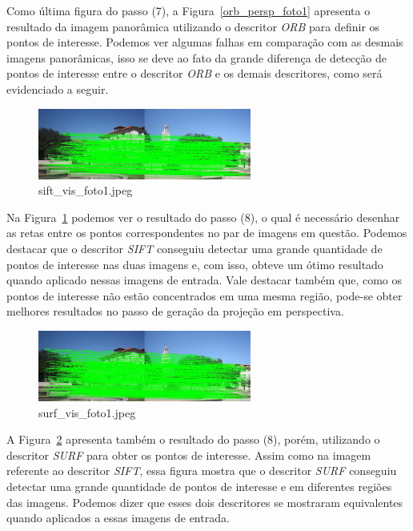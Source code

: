 \documentclass[twoside,twocolumn]{article}
\begin{document}
Como última figura do passo (7), a Figura~\ref{orb_persp_foto1} apresenta o resultado da imagem panorâmica utilizando o descritor \textit{ORB} para definir os pontos de interesse. Podemos ver algumas falhas em comparação com as desmais imagens panorâmicas, isso se deve ao fato da grande diferença de detecção de pontos de interesse entre o descritor \textit{ORB} e os demais descritores, como será evidenciado a seguir. 

\begin{figure}[H]
\begin{center}
	\includegraphics[width=7cm]{figures/sift_vis_foto1.jpeg}
\caption{sift\_vis\_foto1.jpeg} \label{sift_vis_foto1}
\end{center}
\end{figure}

Na Figura~\ref{sift_vis_foto1} podemos ver o resultado do passo (8), o qual é necessário desenhar as retas entre os pontos correspondentes no par de imagens em questão. Podemos destacar que o descritor \textit{SIFT} conseguiu detectar uma grande quantidade de pontos de interesse nas duas imagens e, com isso, obteve um ótimo resultado quando aplicado nessas imagens de entrada. Vale destacar também que, como os pontos de interesse não estão concentrados em uma mesma região, pode-se obter melhores resultados no passo de geração da projeção em perspectiva.

\begin{figure}[H]
\begin{center}
	\includegraphics[width=7cm]{figures/surf_vis_foto1.jpeg}
\caption{surf\_vis\_foto1.jpeg} \label{surf_vis_foto1}
\end{center}
\end{figure}

A Figura~\ref{surf_vis_foto1} apresenta também o resultado do passo (8), porém, utilizando o descritor \textit{SURF} para obter os pontos de interesse. Assim como na imagem referente ao descritor \textit{SIFT}, essa figura mostra que o descritor \textit{SURF} conseguiu detectar uma grande quantidade de pontos de interesse e em diferentes regiões das imagens. Podemos dizer que esses dois descritores se mostraram equivalentes quando aplicados a essas imagens de entrada.
\end{document}
